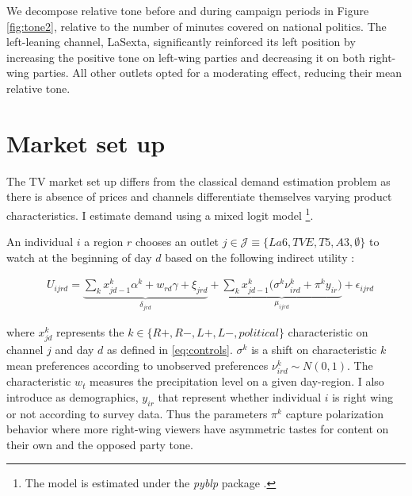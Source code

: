 \documentclass[12pt]{article}
\begin{document}
	We decompose relative tone before and during campaign periods in Figure \ref{fig:tone2}, relative to the number of minutes covered on national politics. The left-leaning channel, LaSexta, significantly reinforced its left position by increasing the positive tone on left-wing parties and decreasing it on both right-wing parties. All other outlets opted for a moderating effect, reducing their mean relative tone.
	
	
	
	
	
	\section{Market set up}\label{section:market}
	
	The TV market set up differs from the classical demand estimation problem as there is absence of prices and channels differentiate themselves varying product characteristics. I estimate demand using a mixed logit model \citep{berry1994estimating} \footnote{The model is estimated under the \textit{pyblp} package \citep{conlon2020best}.}.
	
	
	
	An individual $ i $  a region $r$ chooses an outlet $ j \in \mathcal{J}\equiv \{La6,TVE,T5,A3,\emptyset\}$ to watch at the beginning of day $d$ based on the following indirect utility : 
	
	
	\begin{equation}\label{eq:utility}
		\begin{aligned}
			& U_{ijrd}= \underbrace{\sum_k x_{jd-1}^k\alpha^k+w_{rd}\gamma  +  \xi_{jrd}}_{\delta_{jrd}}  + \underbrace{  \sum_k x_{jd-1}^k \Big( \sigma^k \nu_{ird}^k  + \pi^ky_{ir} \Big)}_{\mu_{ijrd}}+\epsilon_{ijrd} 
		\end{aligned}
	\end{equation} 
	
	where $ x_{jd}^k $ represents the $ k \in \{R+,R-,L+,L-,political\}$ characteristic on channel $ j $ and day $ d$ as defined in \ref{eq:controls}. $ \sigma^k $ is a shift on characteristic $ k $ mean preferences according to unobserved preferences $ \nu_{ird}^k \sim N(0,1)$.  The  characteristic $w_t$ measures the precipitation level on a given day-region. I also introduce as demographics, $ y_{ir} $ that represent whether individual $i$ is right wing or not according to survey data. Thus the parameters $\pi^k$  capture polarization behavior where more right-wing viewers have asymmetric tastes for content on their own and the opposed party tone. 
	
\end{document}
